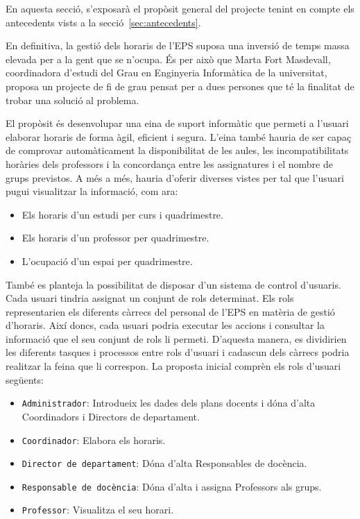 \documentclass[a4paper,12pt]{ThesisStyle}
\begin{document}
En aquesta secció, s'exposarà el propòsit general del projecte tenint en compte els antecedents vists a la secció~\ref{sec:antecedents}.

En definitiva, la gestió dels horaris de l'EPS suposa una inversió de temps massa elevada per a la gent que se n'ocupa. És per això que Marta Fort Masdevall, coordinadora d'estudi del Grau en Enginyeria Informàtica de la universitat, proposa un projecte de fi de grau pensat per a dues persones que té la finalitat de trobar una solució al problema.

El propòsit és desenvolupar una eina de suport informàtic que permeti a l'usuari elaborar horaris de forma àgil, eficient i segura. L'eina també hauria de ser capaç de comprovar automàticament la disponibilitat de les aules, les incompatibilitats horàries dels professors i la concordança entre les assignatures i el nombre de grups previstos. A més a més, hauria d'oferir diverses vistes per tal que l'usuari pugui visualitzar la informació, com ara:
\begin{itemize}
  \item Els horaris d'un estudi per curs i quadrimestre.
  \item Els horaris d'un professor per quadrimestre.
  \item L'ocupació d'un espai per quadrimestre.
\end{itemize}

També es planteja la possibilitat de disposar d'un sistema de control d'usuaris. Cada usuari tindria assignat un conjunt de rols determinat. Els rols representarien els diferents càrrecs del personal de l'EPS en matèria de gestió d'horaris. Així doncs, cada usuari podria executar les accions i consultar la informació que el seu conjunt de rols li permeti. D'aquesta manera, es dividirien les diferents tasques i processos entre rols d'usuari i cadascun dels càrrecs podria realitzar la feina que li correspon. La proposta inicial comprèn els rols d'usuari següents:
\begin{itemize}
  \item \texttt{Administrador}: Introdueix les dades dels plans docents i dóna d'alta Coordinadors i Directors de departament.
  \item \texttt{Coordinador}: Elabora els horaris.
  \item \texttt{Director de departament}: Dóna d'alta Responsables de docència.
  \item \texttt{Responsable de docència}: Dóna d'alta i assigna Professors als grups.
  \item \texttt{Professor}: Visualitza el seu horari.
\end{itemize}
\end{document}
